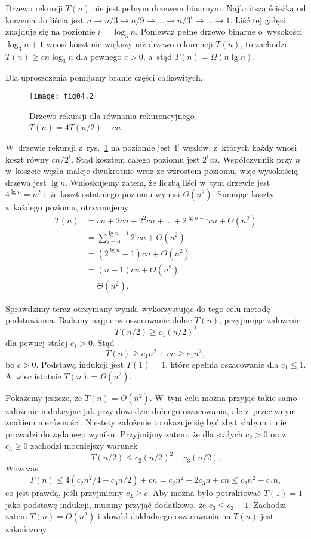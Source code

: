 \exercise %
Drzewo rekursji $T(n)$ nie jest pełnym drzewem binarnym. Najkrótszą ścieżką od korzenia do liścia jest $n\to n/3\to n/9\to\dots\to n/3^i\to\dots\to1$. Liść tej gałęzi znajduje się na poziomie $i=\log_3n$. Ponieważ pełne drzewo binarne o~wysokości $\log_3n+1$ wnosi koszt nie większy niż drzewo rekurencji $T(n)$, to zachodzi $T(n)\ge cn\log_3n$ dla pewnego $c>0$, a~stąd $T(n)=\Omega(n\lg n)$.

\exercise %
Dla uproszczenia pomijamy branie części całkowitych.
\begin{figure}[ht]
	\begin{center}
		\texttt{[image: fig04.2]}
	\end{center}
	\caption{Drzewo rekursji dla równania rekurencyjnego $T(n)=4T(n/2)+cn$.} \label{fig:4.2-3}
\end{figure}
W~drzewie rekursji z~rys.~\ref{fig:4.2-3} na  poziomie jest $4^i$ węzłów, z~których każdy wnosi koszt równy $cn/2^i$. Stąd kosztem całego poziomu jest $2^icn$. Współczynnik przy $n$ w~koszcie węzła maleje dwukrotnie wraz ze wzrostem poziomu, więc wysokością drzewa jest $\lg n$. Wnioskujemy zatem, że liczbą liści w~tym drzewie jest $4^{\lg n}=n^2$ i~że koszt ostatniego poziomu wynosi $\Theta(n^2)$. Sumując koszty z~każdego poziomu, otrzymujemy:
\begin{align*}
	T(n) &= cn+2cn+2^2cn+\dots+2^{\lg n-1}cn+\Theta(n^2) \\
	&= \sum_{i=0}^{\lg n-1}2^icn+\Theta(n^2) \\
	&= (2^{\lg n}-1)cn+\Theta(n^2) \\
	&= (n-1)cn+\Theta(n^2) \\
	&= \Theta(n^2).
\end{align*}

Sprawdzimy teraz otrzymany wynik, wykorzystując do tego celu metodę podstawiania. Badamy najpierw oszacowanie dolne $T(n)$, przyjmując założenie
\[
	T(n/2) \ge c_1(n/2)^2
\]
dla pewnej stałej $c_1>0$. Stąd
\[
	T(n) \ge c_1n^2+cn \ge c_1n^2,
\]
bo $c>0$. Podstawą indukcji jest $T(1)=1$, które spełnia oszacowanie dla $c_1\le1$. A~więc istotnie $T(n)=\Omega(n^2)$.

Pokażemy jeszcze, że $T(n)=O(n^2)$. W~tym celu można przyjąć takie samo założenie indukcyjne jak przy dowodzie dolnego oszacowania, ale z~przeciwnym znakiem nierówności. Niestety założenie to okazuje się być zbyt słabym i~nie prowadzi do żądanego wyniku. Przyjmijmy zatem, że dla stałych $c_2>0$ oraz $c_3\ge0$ zachodzi mocniejszy warunek
\[
	T(n/2) \le c_2(n/2)^2-c_3(n/2).
\]
Wówczas
\[
	T(n) \le 4(c_2n^2\!/4-c_3n/2)+cn = c_2n^2-2c_3n+cn \le c_2n^2-c_3n,
\]
co jest prawdą, jeśli przyjmiemy $c_3\ge c$. Aby można było potraktować $T(1)=1$ jako podstawę indukcji, musimy przyjąć dodatkowo, że $c_3\le c_2-1$. Zachodzi zatem $T(n)=O(n^2)$ i~dowód dokładnego oszacowania na $T(n)$ jest zakończony.

